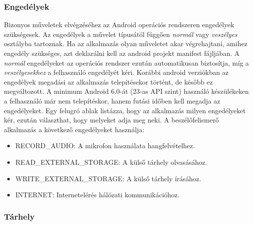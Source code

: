 \subsubsection{Engedélyek}

Bizonyos műveletek elvégzéséhez az Android operációs rendszeren engedélyek szükségesek. Az engedélyek a művelet típusától függően \emph{normál} vagy \emph{veszélyes} osztályba tartoznak. Ha az alkalmazás olyan műveletet akar végrehajtani, amihez engedély szükséges, azt deklarálni kell az android projekt manifest fájljában.
\newline
\newline
A \emph{normál} engedélyeket az operációs rendszer ezután automatikusan biztosítja, míg a \emph{veszélyesekhez} a felhasználó engedélyét kéri. Korábbi android verziókban az engedélyek megadási az alkalmazás telepítésekor történt, de később ez megváltozott. A minimum Android 6.0-át (23-as API szint) használó készülékeken a felhasználó már nem telepítéskor, hanem futási időben kell megadja az engedélyeket. Egy felugró ablak listázza, hogy az alkalmazás milyen engedélyeket kér, ezután választhat, hogy melyeket adja meg neki.
\newline
\newline
A beszélőfelismerő alkalmazás a következő engedélyeket használja:

\begin{itemize}
	\item RECORD\_AUDIO: A mikrofon használata hangfelvételhez.
	\item READ\_EXTERNAL\_STORAGE: A külső tárhely olvasásához.
	\item WRITE\_EXTERNAL\_STORAGE: A külső tárhely írásához.
	\item INTERNET: Internetelérés hálózati kommunikációhoz.
\end{itemize}

\subsubsection{Tárhely}

